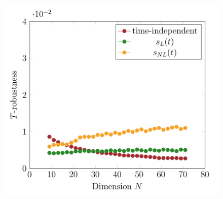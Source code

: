 \documentclass{beamer}
\begin{document}
\begin{frame}
\begin{columns}
	\begin{column}[T]{0.4\textwidth}
		\begin{figure}
		\centering
			\includegraphics[width=\textwidth]{time_robustness.png}
		\end{figure}
	\end{column}

\end{columns}
\end{frame}

\end{document}
